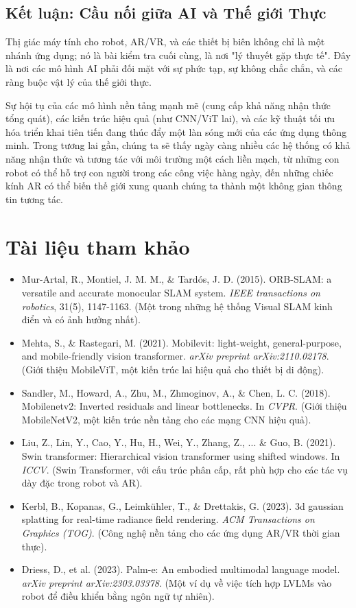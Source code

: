 \subsection{Kết luận: Cầu nối giữa AI và Thế giới Thực}
\label{subsec:robotics_ar_edge_conclusion}
Thị giác máy tính cho robot, AR/VR, và các thiết bị biên không chỉ là một nhánh ứng dụng; nó là bài kiểm tra cuối cùng, là nơi "lý thuyết gặp thực tế". Đây là nơi các mô hình AI phải đối mặt với sự phức tạp, sự không chắc chắn, và các ràng buộc vật lý của thế giới thực.

Sự hội tụ của các mô hình nền tảng mạnh mẽ (cung cấp khả năng nhận thức tổng quát), các kiến trúc hiệu quả (như CNN/ViT lai), và các kỹ thuật tối ưu hóa triển khai tiên tiến đang thúc đẩy một làn sóng mới của các ứng dụng thông minh. Trong tương lai gần, chúng ta sẽ thấy ngày càng nhiều các hệ thống có khả năng nhận thức và tương tác với môi trường một cách liền mạch, từ những con robot có thể hỗ trợ con người trong các công việc hàng ngày, đến những chiếc kính AR có thể biến thế giới xung quanh chúng ta thành một không gian thông tin tương tác.

\section*{Tài liệu tham khảo}
\begin{itemize}
	\item[1] Mur-Artal, R., Montiel, J. M. M., \& Tardós, J. D. (2015). ORB-SLAM: a versatile and accurate monocular SLAM system. \textit{IEEE transactions on robotics}, 31(5), 1147-1163. (Một trong những hệ thống Visual SLAM kinh điển và có ảnh hưởng nhất).
	\item[2] Mehta, S., \& Rastegari, M. (2021). Mobilevit: light-weight, general-purpose, and mobile-friendly vision transformer. \textit{arXiv preprint arXiv:2110.02178}. (Giới thiệu MobileViT, một kiến trúc lai hiệu quả cho thiết bị di động).
	\item[3] Sandler, M., Howard, A., Zhu, M., Zhmoginov, A., \& Chen, L. C. (2018). Mobilenetv2: Inverted residuals and linear bottlenecks. In \textit{CVPR}. (Giới thiệu MobileNetV2, một kiến trúc nền tảng cho các mạng CNN hiệu quả).
	\item[4] Liu, Z., Lin, Y., Cao, Y., Hu, H., Wei, Y., Zhang, Z., ... \& Guo, B. (2021). Swin transformer: Hierarchical vision transformer using shifted windows. In \textit{ICCV}. (Swin Transformer, với cấu trúc phân cấp, rất phù hợp cho các tác vụ dày đặc trong robot và AR).
	\item[5] Kerbl, B., Kopanas, G., Leimkühler, T., \& Drettakis, G. (2023). 3d gaussian splatting for real-time radiance field rendering. \textit{ACM Transactions on Graphics (TOG)}. (Công nghệ nền tảng cho các ứng dụng AR/VR thời gian thực).
	\item[6] Driess, D., et al. (2023). Palm-e: An embodied multimodal language model. \textit{arXiv preprint arXiv:2303.03378}. (Một ví dụ về việc tích hợp LVLMs vào robot để điều khiển bằng ngôn ngữ tự nhiên).
\end{itemize}